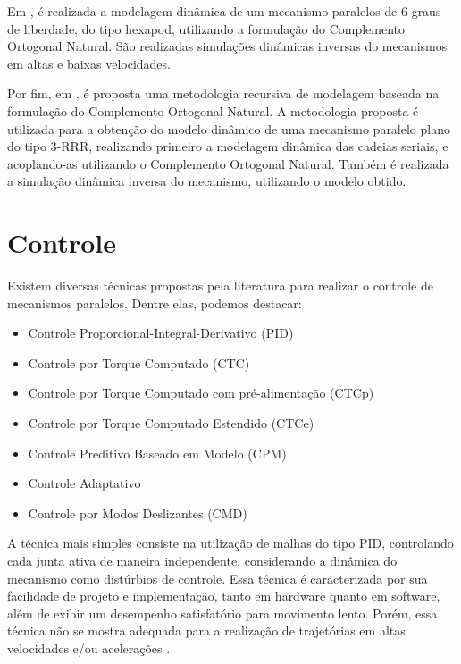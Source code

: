 \documentclass[]{politex}
\begin{document}
Em \cite{Xi}, é realizada a modelagem dinâmica de um mecanismo paralelos de 6 graus de liberdade, do tipo hexapod, utilizando a formulação do Complemento Ortogonal Natural. São realizadas simulações dinâmicas inversas do mecanismos em altas e baixas velocidades.

Por fim, em \cite{Khan}, é proposta uma metodologia recursiva de modelagem baseada na formulação do Complemento Ortogonal Natural. A metodologia proposta é utilizada para a obtenção do modelo dinâmico de uma mecanismo paralelo plano do tipo 3-RRR, realizando primeiro a modelagem dinâmica das cadeias seriais, e acoplando-as utilizando o Complemento Ortogonal Natural. Também é realizada a simulação dinâmica inversa do mecanismo, utilizando o modelo obtido.









\section{Controle}

Existem diversas técnicas propostas pela literatura para realizar o controle de mecanismos paralelos. Dentre elas, podemos destacar:

\begin{itemize}
\item Controle Proporcional-Integral-Derivativo (PID)
\item Controle por Torque Computado (CTC)
\item Controle por Torque Computado com pré-alimentação (CTCp)
\item Controle por Torque Computado Estendido (CTCe)
\item Controle Preditivo Baseado em Modelo (CPM)
\item Controle Adaptativo
\item Controle por Modos Deslizantes (CMD)
\end{itemize}

A técnica mais simples consiste na utilização de malhas do tipo PID, controlando cada junta ativa de maneira independente, considerando a dinâmica do mecanismo como distúrbios de controle. Essa técnica é caracterizada por sua facilidade de projeto e implementação, tanto em hardware quanto em software, além de exibir um desempenho satisfatório para movimento lento. Porém, essa técnica não se mostra adequada para a realização de trajetórias em altas velocidades e/ou acelerações \cite{Honegger, Zubizarreta}.
\end{document}
